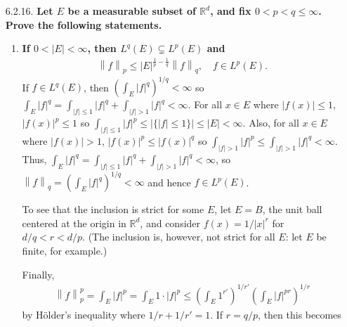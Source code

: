 \documentclass[a4paper,12pt]{article}
\newcommand{\norm}[1]{\left\lVert#1\right\rVert}
\begin{document}
\begin{enumerate}
    \item[6.2.16.]
        \boldmath\textbf{Let $E$ be a measurable subset of $\mathbb{R}^d$, and fix $0 < p < q \leq \infty$. Prove the following statements.
        }\unboldmath
        \begin{enumerate}
            \item
                \boldmath\textbf{If $0 < |E| < \infty$, then $L^q(E) \subsetneq L^p(E)$ and
                    \begin{align*}
                        \norm{f}_p \leq |E|^{\frac{1}{p} - \frac{1}{q}} \norm{f}_q, \quad f \in L^p(E).
                    \end{align*}
                }\unboldmath
                If $f \in L^q(E)$, then $\left( \int_E |f|^q \right)^{1/q} < \infty$ so $\int_E |f|^q = \int_{|f| \leq 1} |f|^q + \int_{|f| > 1} |f|^q < \infty$. For all $x \in E$ where $|f(x)| \leq 1$, $|f(x)|^p \leq 1$ so $\int_{|f| \leq 1} |f|^p \leq |\{|f| \leq 1\}| \leq |E| < \infty$. Also, for all $x \in E$ where $|f(x)| > 1$, $|f(x)|^p \leq |f(x)|^q$ so $\int_{|f| > 1} |f|^p \leq \int_{|f| > 1} |f|^q < \infty$. Thus, $\int_E |f|^q = \int_{|f| \leq 1} |f|^q + \int_{|f| > 1} |f|^q < \infty$, so $\norm{f}_q = \left( \int_E |f|^q \right)^{1/q} < \infty$ and hence $f \in L^p(E)$. \par
                To see that the inclusion is strict for some $E$, let $E = B$, the unit ball centered at the origin in $\mathbb{R}^d$, and consider $f(x) = 1/|x|^r$ for $d/q < r < d/p$. (The inclusion is, however, not strict for all $E$: let $E$ be finite, for example.) \par
                Finally, %
                \begin{align*}
                    \norm{f}_p^p = \int_E |f|^p = \int_E 1 \cdot |f|^p \leq \left( \int_E 1^{r'} \right)^{1/r'} \left( \int_E |f|^{pr} \right)^{1/r}
                \end{align*}
                by H\"older's inequality where $1/r + 1/r' = 1$. If $r = q/p$, then this becomes
                \begin{gather*}

\end{gather*}
\end{enumerate}
\end{enumerate}
\end{document}
